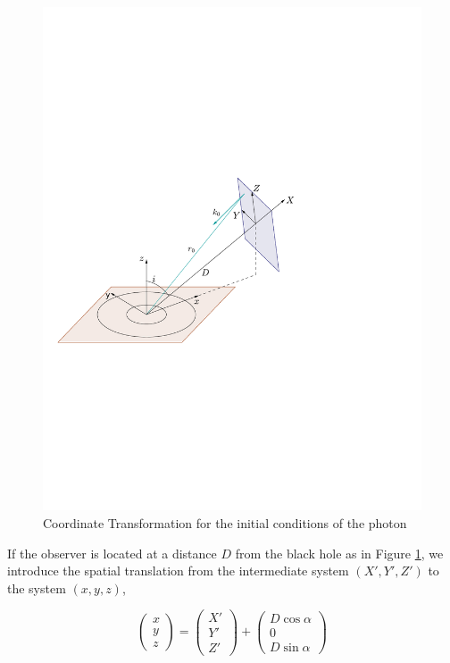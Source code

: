 \begin{figure}[h!]
\begin{center}
\includegraphics[scale=0.7]{figure01.pdf} 
\caption{Coordinate Transformation for the initial conditions of the photon}
\label{fig: CoordinateTransformation }
\end{center}
\end{figure}

If the observer is located at a distance $D$ from the black hole as in Figure \ref{fig: CoordinateTransformation }, we introduce the spatial translation from the intermediate system $(X',Y',Z')$ to the system $(x,y,z)$,

\begin{equation}
\begin{pmatrix}
x \\
y \\
z
\end{pmatrix} =\begin{pmatrix}
X' \\
Y' \\
Z'
\end{pmatrix} +
\begin{pmatrix}
D \cos \alpha \\
0 \\
D \sin \alpha
\end{pmatrix}
\end{equation}

